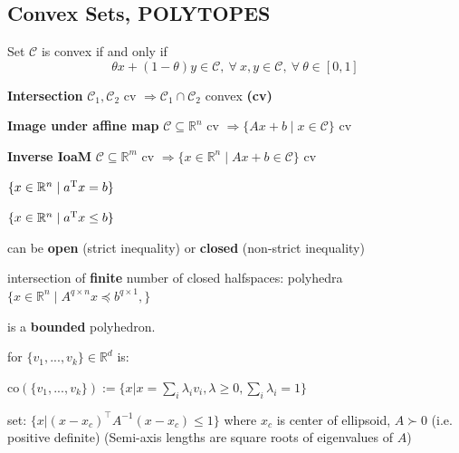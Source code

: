 \subsection{Convex Sets, POLYTOPES}

\begin{definition}
	Set $\mathcal{C}$ is convex if and only if
	\[\theta x + (1-\theta)y \in \mathcal{C},
		\ \forall\ x,y \in \mathcal{C},
		\ \forall\ \theta \in [0,1]\]
\end{definition}


\textbf{Intersection}
$\mathcal{C}_1, \mathcal{C}_2$ cv
$\Rightarrow \mathcal{C}_1 \cap \mathcal{C}_2$ convex \textbf{(cv)}

\textbf{Image under affine map}
$\mathcal{C} \subseteq  \mathbb{R}^{n}$ cv
$\Rightarrow \{Ax+b \mid x \in \mathcal{C} \}$ cv

\textbf{Inverse IoaM}
$\mathcal{C} \subseteq  \mathbb{R}^{m}$ cv
$\Rightarrow \{x\in\mathbb{R}^{n} \mid  Ax+b\in\mathcal{C}\}$ cv

\begin{definition}[Hyperplanes]
	$\{x \in \mathbb{R}^n \mid a^\textnormal{\scriptsize T} x=b\}$
\end{definition}
\begin{definition}[Halfspaces]
	$\{x \in \mathbb{R}^n \mid a^\textnormal{\scriptsize T} x\le b\}$

	can be \textbf{open} (strict inequality)
	or \textbf{closed} (non-strict inequality)
\end{definition}

\begin{definition}[Polyhedra] intersection of
	\textbf{finite} number of closed halfspaces:
	polyhedra $\{x\in\mathbb{R}^n\mid A^{q\times n}x\preceq b^{q\times1},
		\}$
\end{definition}

\begin{definition}[Polytope]
	is a \textbf{bounded} polyhedron.
\end{definition}

\begin{definition}
	for  $\{v_1,...,v_k\}\in \mathbb{R}^{d}$ is:

	co$(\{v_1,...,v_k\}):=
		\{ x|x=\sum_{i}\lambda_iv_i,
		\lambda\ge0, \sum_{i}\lambda_i=1 \}$
\end{definition}

\begin{definition}[Ellipsoid]
	set:
	$\{ x | (x\!-\!x_c)^\top A^{-1}(x\!-\!x_c) \leq 1 \}$
	where $x_c$ is center of ellipsoid,
	$A \succ 0$ (i.e. positive definite)
	(Semi-axis lengths are square roots of eigenvalues of $A$)
\end{definition}

